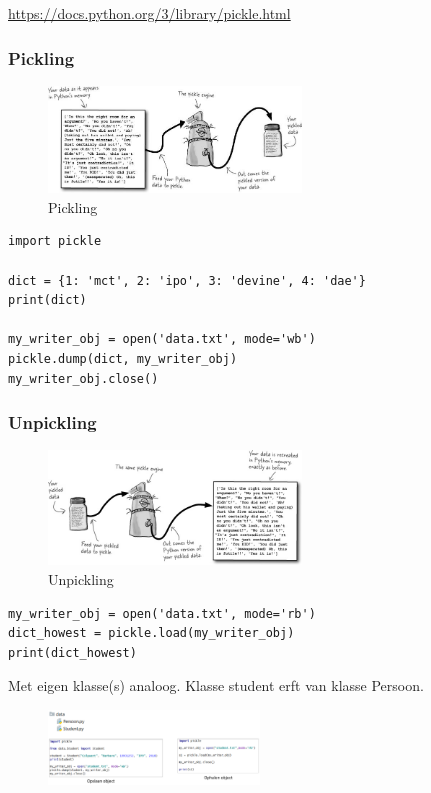\documentclass{article}
\begin{document}
\url{https://docs.python.org/3/library/pickle.html}

\subsubsection{Pickling}

\begin{figure}[H]
    \centering
    \includegraphics[width=0.6\textwidth]{pickling.png}
    \caption{Pickling}
\end{figure}

\begin{verbatim}
import pickle

dict = {1: 'mct', 2: 'ipo', 3: 'devine', 4: 'dae'}
print(dict)

my_writer_obj = open('data.txt', mode='wb')
pickle.dump(dict, my_writer_obj)
my_writer_obj.close()
\end{verbatim}

\subsubsection{Unpickling}

\begin{figure}[H]
    \centering
    \includegraphics[width=0.6\textwidth]{unpickling.png}
    \caption{Unpickling}
\end{figure}

\begin{verbatim}
my_writer_obj = open('data.txt', mode='rb')
dict_howest = pickle.load(my_writer_obj)
print(dict_howest)
\end{verbatim}

Met eigen klasse(s) analoog. Klasse student erft van klasse Persoon.

\begin{figure}[H]
    \centering
    \includegraphics[width=0.5\textwidth]{unpickling2.png}
    \caption{}
\end{figure}
\end{document}
